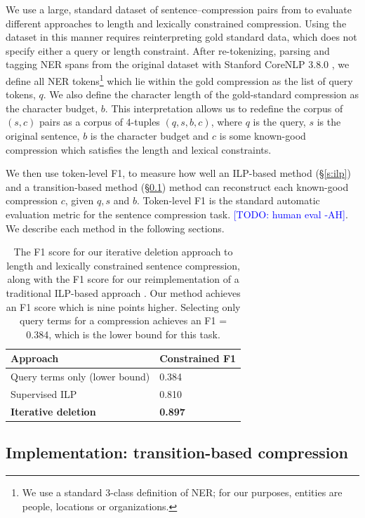 \documentclass[11pt,a4paper]{article}
\newcommand{\ahcomment}[1]{\textcolor{blue}{[#1 -AH]}}
\begin{document}
We use a large, standard dataset of sentence--compression pairs from \citet{filippova2013overcoming} to evaluate different approaches to length and lexically constrained compression. Using the dataset in this manner requires reinterpreting gold standard data, which does not specify either a query or length constraint. After re-tokenizing, parsing and tagging NER spans from the original dataset with Stanford CoreNLP 3.8.0 \cite{corenlp}, we define all NER tokens\footnote{We use a standard 3-class definition of NER; for our purposes, entities are people, locations or organizations.} which lie within the gold compression as the list of query tokens, $q$. We also define the character length of the gold-standard compression as the character budget, $b$. This interpretation allows us to redefine the corpus of $(s,c)$ pairs as a corpus of 4-tuples $(q,s,b,c)$, where $q$ is the query, $s$ is the original sentence, $b$ is the character budget and $c$ is some known-good compression which satisfies the length and lexical constraints. 

We then use token-level F1, to measure how well an ILP-based method (\S\ref{s:ilp}) and a transition-based method (\S\ref{s:transition}) method can reconstruct each known-good compression $c$, given $q,s$ and $b$. Token-level F1 is the standard automatic evaluation metric for the sentence compression task. \ahcomment{TODO: human eval}. We describe each method in the following sections.
    
\begin{table}[htb!]
\begin{tabular}{ll}
\centering
Approach & Constrained F1  \\ \hline
Query terms only (lower bound) & 0.384    \\
Supervised ILP  & 0.810           \\
 \textbf{Iterative deletion} &  \textbf{0.897}    \\
\end{tabular}
\caption{The F1 score for our iterative deletion approach to length and lexically constrained sentence compression, along with the F1 score for our reimplementation of a traditional ILP-based approach \cite{filippova2013overcoming}. Our method achieves an F1 score which is nine points higher. Selecting only query terms for a compression achieves an F1 = 0.384, which is the lower bound for this task.}
\end{table}

\subsection{Implementation: transition-based compression}\label{s:transition}
\end{document}
